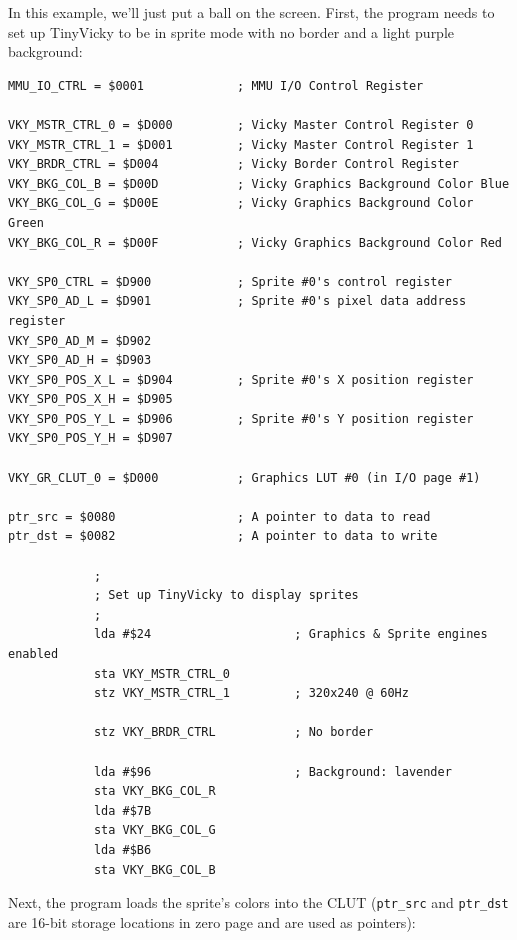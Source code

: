 In this example, we'll just put a ball on the screen. First, the program needs to set up TinyVicky to be in sprite mode with no border and a light purple background:

\begin{verbatim}
MMU_IO_CTRL = $0001             ; MMU I/O Control Register

VKY_MSTR_CTRL_0 = $D000         ; Vicky Master Control Register 0
VKY_MSTR_CTRL_1 = $D001         ; Vicky Master Control Register 1
VKY_BRDR_CTRL = $D004           ; Vicky Border Control Register
VKY_BKG_COL_B = $D00D           ; Vicky Graphics Background Color Blue
VKY_BKG_COL_G = $D00E           ; Vicky Graphics Background Color Green
VKY_BKG_COL_R = $D00F           ; Vicky Graphics Background Color Red

VKY_SP0_CTRL = $D900            ; Sprite #0's control register
VKY_SP0_AD_L = $D901            ; Sprite #0's pixel data address register
VKY_SP0_AD_M = $D902
VKY_SP0_AD_H = $D903
VKY_SP0_POS_X_L = $D904         ; Sprite #0's X position register
VKY_SP0_POS_X_H = $D905
VKY_SP0_POS_Y_L = $D906         ; Sprite #0's Y position register
VKY_SP0_POS_Y_H = $D907

VKY_GR_CLUT_0 = $D000           ; Graphics LUT #0 (in I/O page #1)

ptr_src = $0080                 ; A pointer to data to read
ptr_dst = $0082                 ; A pointer to data to write

            ;
            ; Set up TinyVicky to display sprites
            ;
            lda #$24                    ; Graphics & Sprite engines enabled
            sta VKY_MSTR_CTRL_0
            stz VKY_MSTR_CTRL_1         ; 320x240 @ 60Hz

            stz VKY_BRDR_CTRL           ; No border

            lda #$96                    ; Background: lavender
            sta VKY_BKG_COL_R
            lda #$7B
            sta VKY_BKG_COL_G
            lda #$B6
            sta VKY_BKG_COL_B
\end{verbatim}

Next, the program loads the sprite's colors into the CLUT (\verb+ptr_src+ and \verb+ptr_dst+ are 16-bit storage locations in zero page and are used as pointers):

